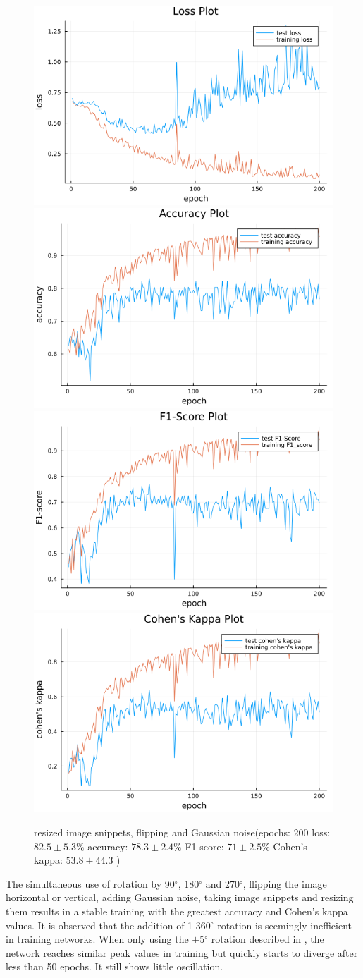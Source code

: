 \documentclass[
a4paper, 
12pt,
grayscalebody, %
abstract=on,
twoside, BCOR10mm, 12pt, DIV13,headinclude, footexclude, final, abstracton, openright
]{ibireprt}
\numberwithin{equation}{chapter}
\numberwithin{table}{chapter}
\numberwithin{figure}{chapter}
\numberwithin{algorithm}{chapter}
\numberwithin{example}{chapter}
\numberwithin{example}{chapter}
\begin{document}
\begin{figure}
	\includegraphics[width=0.4\linewidth]{loss_png_final_run_0_6.png}\hfill
	\includegraphics[width=0.4\linewidth]{accuracy_png_final_run_0_6.png}
	\\[\smallskipamount]
	\includegraphics[width=0.4\linewidth]{f1_score_png_final_run_0_6.png}\hfill
	\includegraphics[width=0.4\linewidth]{cohens_kappa_png_final_run_0_6.png}
	\caption{resized image snippets, flipping and Gaussian noise(epochs: 200 loss: $82.5\pm5.3\% $ accuracy: $78.3\pm2.4\%$ F1-score: $71\pm2.5\%$  Cohen's kappa: $53.8\pm44.3$ )}
\end{figure}%

	\clearpage

The simultaneous use of rotation by 90$^{\circ}$, 180$^{\circ}$ and 270$^{\circ}$, flipping the image horizontal or vertical, adding Gaussian noise, taking image snippets and resizing them results in a stable training with the greatest accuracy and Cohen's kappa values. It is observed that the addition of 1-360$^{\circ}$ rotation is seemingly inefficient in training networks. When only using the $\pm$5$^{\circ}$ rotation described in \cite{Zhang2020}, the network reaches similar peak values in training but quickly starts to diverge after less than 50 epochs. It still shows little oscillation.
\end{document}
